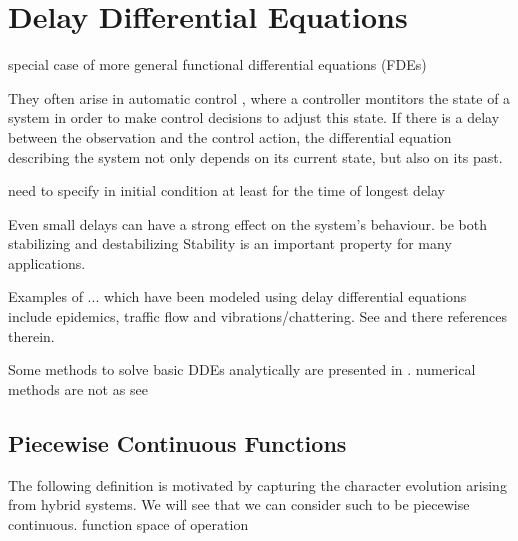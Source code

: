 \chapter{Delay Differential Equations}

special case of more general functional differential equations (FDEs)

They often arise in automatic control %
, where a controller montitors the state of a system in order to make control decisions to adjust this state.
If there is a delay between the observation and the control action, the differential equation describing the system not only depends on its current state, but also on its past.

need to specify in initial condition
at least for the time of longest delay

Even small delays can have a strong effect on the system's behaviour.
be both stabilizing and destabilizing
Stability is an important property for many applications.

Examples of ... which have been modeled using delay differential equations include epidemics, traffic flow and vibrations/chattering. See \cite{Falbo06FDEs} and there references therein.

Some methods to solve basic DDEs analytically are presented in \cite{Falbo06FDEs}.
numerical methods are not as 
see \cite{Bellen13NumericalDDEs}

\section{Piecewise Continuous Functions}
    \label{sec:piecewise-continuous-functions}
    
    The following definition is motivated by capturing the character evolution arising from hybrid systems. We will see that we can consider such to be piecewise continuous.
    function space of operation


